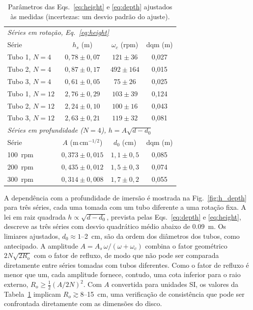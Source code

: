 \documentclass[aps,pre,twocolumn,superscriptaddress,nofootinbib,floatfix]{revtex4-2}
\begin{document}
\begin{table}[b]
  \caption{Parâmetros das Eqs.~\eqref{eq:height} e \eqref{eq:depth} ajustados às medidas (incertezas: um desvio padrão do ajuste).}
  \label{tab:fits}
  \begin{ruledtabular}
  \begin{tabular}{lccc}
    \multicolumn{4}{l}{\emph{Séries em rotação, Eq.~\eqref{eq:height}}}\\
    Série & $h_s$ (m) & $\omega_c$ (rpm) & dqm (m) \\
    \midrule
    Tubo 1, $N=4$  & $0{,}78\pm0{,}07$ & $121\pm36$  & 0,027 \\
    Tubo 2, $N=4$  & $0{,}87\pm0{,}17$ & $492\pm164$ & 0,015 \\
    Tubo 3, $N=4$  & $0{,}61\pm0{,}05$ & $75\pm26$   & 0,025 \\
    Tubo 1, $N=12$ & $2{,}76\pm0{,}29$ & $103\pm39$  & 0,124 \\
    Tubo 2, $N=12$ & $2{,}24\pm0{,}10$ & $100\pm16$  & 0,043 \\
    Tubo 3, $N=12$ & $2{,}63\pm0{,}21$ & $119\pm32$  & 0,081 \\
    \midrule
    \multicolumn{4}{l}{\emph{Séries em profundidade ($N=4$), $h=A\sqrt{d-d_0}$}}\\
    Série & $A$ (m\,cm$^{-1/2}$) & $d_0$ (cm) & dqm (m) \\
    \midrule
    \SI{100}{rpm} & $0{,}373\pm0{,}015$ & $1{,}1\pm0{,}5$ & 0,085 \\
    \SI{200}{rpm} & $0{,}435\pm0{,}012$ & $1{,}5\pm0{,}3$ & 0,074 \\
    \SI{300}{rpm} & $0{,}314\pm0{,}008$ & $1{,}7\pm0{,}2$ & 0,055 \\
  \end{tabular}
  \end{ruledtabular}
\end{table}

A dependência com a profundidade de imersão é mostrada na Fig.~\ref{fig:h_depth} para três séries, cada uma tomada com um tubo diferente a uma rotação fixa. A lei em raiz quadrada $h\propto\sqrt{d-d_0}$, prevista pelas Eqs.~\eqref{eq:depth} e \eqref{eq:height}, descreve as três séries com desvio quadrático médio abaixo de \SI{0.09}{m}. Os limiares ajustados, $d_0\approx1$--\SI{2}{cm}, são da ordem dos diâmetros dos tubos, como antecipado. A amplitude $A=A_s\,\omega/(\omega+\omega_c)$ combina o fator geométrico $2N\sqrt{2R_o}$ com o fator de refluxo, de modo que não pode ser comparada diretamente entre séries tomadas com tubos diferentes. Como o fator de refluxo é menor que um, cada amplitude fornece, contudo, uma cota inferior para o raio externo, $R_o\geq\tfrac12(A/2N)^2$. Com $A$ convertida para unidades SI, os valores da Tabela~\ref{tab:fits} implicam $R_o\gtrsim8$--\SI{15}{cm}, uma verificação de consistência que pode ser confrontada diretamente com as dimensões do disco.
\end{document}
